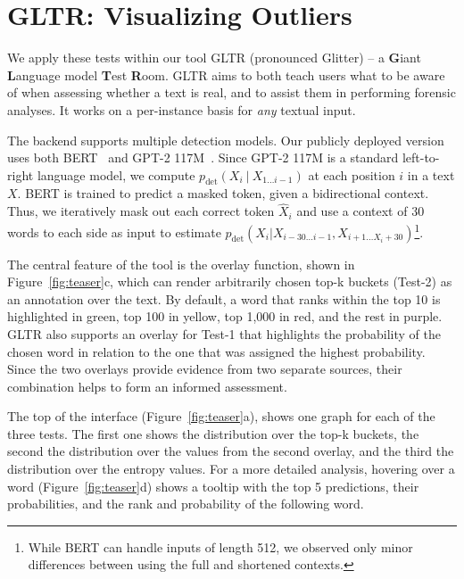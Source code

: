\documentclass[11pt,a4paper]{article}
\begin{document}
\section{GLTR: Visualizing Outliers}
We apply these tests within our tool GLTR (pronounced Glitter) -- a \textbf{G}iant \textbf{L}anguage model \textbf{T}est \textbf{R}oom. GLTR aims to both teach users what to be aware of when assessing whether a text is real, and to assist them in performing forensic analyses. It works on a per-instance basis for \textit{any} textual input.

The backend supports multiple detection models. Our publicly deployed version uses both BERT~\citep{devlin2018bert} and GPT-2 117M~\citep{radford2019language}. %
Since GPT-2 117M is a standard left-to-right language model, we compute $p_{\mathrm{det}}(X_i\ |\ X_{1\ldots i-1})$ at each position $i$ in a text $X$.
BERT is trained to predict a masked token, given a bidirectional context. Thus, we iteratively mask out each correct token $\hat{X}_i$ and use a context of $30$ words to each side as input to estimate $p_{\mathrm{det}}(X_i|X_{i-30\ldots i-1}, X_{i+1\ldots X_i+30})$\footnote{While BERT can handle inputs of length 512, we observed only minor differences between using the full and shortened contexts.}.




The central feature of the tool is the overlay function, shown in Figure~\ref{fig:teaser}c, which can render arbitrarily chosen top-k buckets (Test-2) as an annotation over the text.
By default, a word that ranks within the top 10 is highlighted in green, top 100 in yellow, top 1,000 in red, and the rest in purple. GLTR also supports an overlay for Test-1 that highlights the probability of the chosen word in relation to the one that was assigned the highest probability. Since the two overlays provide evidence from two separate sources, their combination helps to form an informed assessment.

The top of the interface (Figure~\ref{fig:teaser}a), shows one graph for each of the three tests. The first one shows the distribution over the top-k buckets, the second the distribution over the values from the second overlay, and the third the distribution over the entropy values.
For a more detailed analysis, hovering over a word (Figure~\ref{fig:teaser}d) shows a tooltip with the top 5 predictions, their probabilities, and the rank and probability of the following word.
\end{document}
